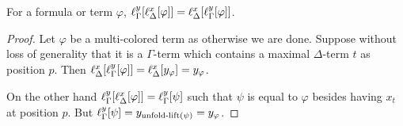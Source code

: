 \begin{lemma}

	For a formula or term $\varphi$,
	$ \ell_{\Gamma}^{y}[ \ell_{\Delta}^{x}[ \varphi]  ] =
	\ell_{\Delta}^{x}[ \ell_{\Gamma}^{y}[ \varphi ]  ]$.
	\label{lemma:lifting_order_not_relevant}

\end{lemma}
\begin{proof}
	Let $\varphi$ be a multi-colored term as otherwise we are done.
	Suppose without loss of generality that it is a $\Gamma$-term which contains a maximal $\Delta$-term $t$ as position $p$.
	Then $\ell_{\Delta}^{x}[ \ell_{\Gamma}^{y}[ \varphi ]  ]
	= \ell_{\Delta}^{x}[ y_\varphi ]
	= y_\varphi $.

	On the other hand
	$\ell_{\Gamma}^{y}[ \ell_{\Delta}^{x}[ \varphi]  ] = \ell_{\Gamma}^{y}[ \psi ]$ such that $\psi$ is equal to $\varphi$ besides having $x_t$ at position $p$.
	But $\ell_{\Gamma}^{y}[ \psi ] = y_{\operatorname{unfold-lift}(\psi)} = y_\varphi$.
	\begin{comment}

		Suppose a term $t$ in $C$ is affected by a lifting.
		We only need to consider maximal colored terms as grey terms are not affected by the liftings.
		Without loss of generality let $t$ be a maximal $\Delta$-colored term.

		Let $\Phi$ be the positions of maximal occurrences of $t$.
		Then in the left hand side, exactly all terms at positions $\Phi$ are replaced by $x_i$ for some $i$.

		In the right hand side, all terms at positions $\Phi$ are replaced by $\lft{\Gamma}{y'}{t}$ first. 
		However after this step,
		all these terms are equal to $\lft{\Gamma}{y'}{t}$, and as all distinct maximal $\Gamma$-terms are replaced by distinct variables, no other maximal colored term is equal to $\lft{\Gamma}{y'}{t}$.
		Hence exactly the terms at positions $\Phi$ are replaced by the same variable $x'_j$ for some $j$.
	\end{comment}
\end{proof}


